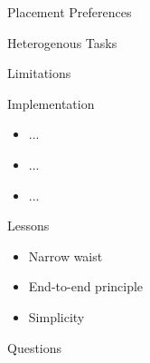 \documentclass{beamer}
\begin{document}
\begin{frame}{Placement Preferences}
\end{frame}

\begin{frame}{Heterogenous Tasks}
\end{frame}

\begin{frame}{Limitations}
\end{frame}

\begin{frame}{Implementation}
  \begin{itemize}
    \item ...
    \item ...
    \item ...
  \end{itemize}
\end{frame}

\begin{frame}{Lessons}
  \begin{itemize}
    \item Narrow waist
    \item End-to-end principle
    \item Simplicity
  \end{itemize}
\end{frame}

\begin{frame}
  \begin{center}
    \Huge Questions
  \end{center}
\end{frame}
\end{document}
